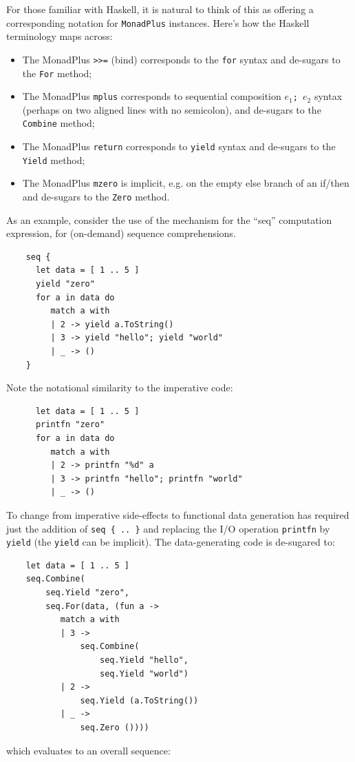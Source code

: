 \documentclass[acmsmall,screen]{acmart}
\begin{document}
For those familiar with Haskell, it is natural to think of this as offering a corresponding notation for 
\texttt{MonadPlus} \citep{RefMonadPlus} instances.  Here’s how the Haskell terminology maps across:
\begin{itemize}
\item The MonadPlus \verb!>>=! (bind) corresponds to the \texttt{for} syntax and de-sugars to the \texttt{For} method;
\item The MonadPlus \texttt{mplus} corresponds to sequential composition \texttt{$e_1$; $e_2$} syntax (perhaps on two aligned lines with no semicolon), and de-sugars to the \texttt{Combine} method;
\item The MonadPlus \texttt{return} corresponds to \texttt{yield} syntax and de-sugars to the \texttt{Yield} method;
\item The MonadPlus \texttt{mzero}  is implicit, e.g. on the empty else branch of an if/then and de-sugars to the \texttt{Zero} method.
\end{itemize}
As an example, consider the use of the mechanism for the “seq” computation expression, for (on-demand) sequence comprehensions. 
\begin{verbatim}
    seq {
      let data = [ 1 .. 5 ]
      yield "zero"
      for a in data do
         match a with
         | 2 -> yield a.ToString() 
         | 3 -> yield "hello"; yield "world"
         | _ -> () 
    }
\end{verbatim}
Note the notational similarity to the imperative code:
\begin{verbatim}
      let data = [ 1 .. 5 ]
      printfn "zero"
      for a in data do
         match a with
         | 2 -> printfn "%d" a
         | 3 -> printfn "hello"; printfn "world"
         | _ -> () 
\end{verbatim}
To change from imperative side-effects to functional data generation has required just the addition of \texttt{seq \{ .. \}} and replacing the I/O operation \texttt{printfn} by \texttt{yield} (the
\texttt{yield} can be implicit). The data-generating code is de-sugared to:
\begin{verbatim}
    let data = [ 1 .. 5 ]
    seq.Combine(
        seq.Yield "zero",
        seq.For(data, (fun a ->
           match a with
           | 3 -> 
               seq.Combine(
                   seq.Yield "hello", 
                   seq.Yield "world")
           | 2 ->
               seq.Yield (a.ToString())
           | _ ->
               seq.Zero ())))
\end{verbatim}
which evaluates to an overall sequence:
\end{document}
